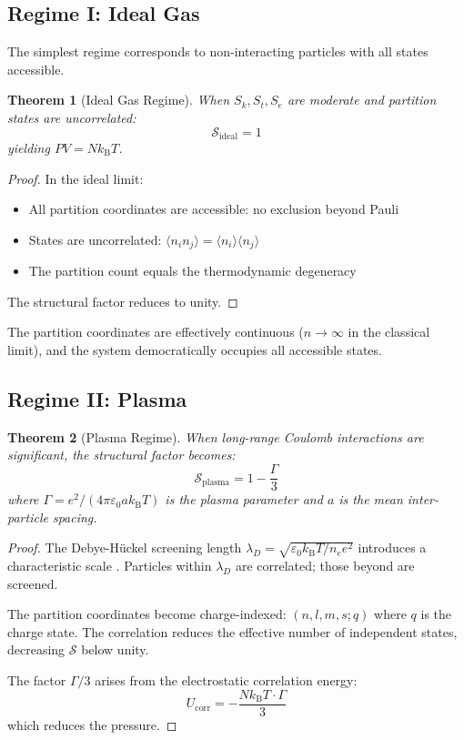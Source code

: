 \documentclass[twocolumn,10pt,a4paper]{article}
\newtheorem{theorem}{Theorem}[section]
\theoremstyle{definition}
\theoremstyle{remark}
\newcommand{\kB}{k_{\mathrm{B}}}
\newcommand{\Sk}{S_k}
\newcommand{\St}{S_t}
\newcommand{\Se}{S_e}
\begin{document}
\subsection{Regime I: Ideal Gas}

The simplest regime corresponds to non-interacting particles with all states accessible.

\begin{theorem}[Ideal Gas Regime]
When $\Sk, \St, \Se$ are moderate and partition states are uncorrelated:
\begin{equation}
    \mathcal{S}_{\text{ideal}} = 1
\end{equation}
yielding $PV = N\kB T$.
\end{theorem}

\begin{proof}
In the ideal limit:
\begin{itemize}
    \item All partition coordinates are accessible: no exclusion beyond Pauli
    \item States are uncorrelated: $\langle n_i n_j \rangle = \langle n_i \rangle \langle n_j \rangle$
    \item The partition count equals the thermodynamic degeneracy
\end{itemize}
The structural factor reduces to unity.
\end{proof}

The partition coordinates are effectively continuous ($n \to \infty$ in the classical limit), and the system democratically occupies all accessible states.

\subsection{Regime II: Plasma}

\begin{theorem}[Plasma Regime]
When long-range Coulomb interactions are significant, the structural factor becomes:
\begin{equation}
    \mathcal{S}_{\text{plasma}} = 1 - \frac{\Gamma}{3}
\end{equation}
where $\Gamma = e^2/(4\pi\varepsilon_0 a \kB T)$ is the plasma parameter and $a$ is the mean inter-particle spacing.
\end{theorem}

\begin{proof}
The Debye-H\"{u}ckel screening length $\lambda_D = \sqrt{\varepsilon_0 \kB T / n_e e^2}$ introduces a characteristic scale \cite{debye1923}. Particles within $\lambda_D$ are correlated; those beyond are screened.

The partition coordinates become charge-indexed: $(n, l, m, s; q)$ where $q$ is the charge state. The correlation reduces the effective number of independent states, decreasing $\mathcal{S}$ below unity.

The factor $\Gamma/3$ arises from the electrostatic correlation energy:
\begin{equation}
    U_{\text{corr}} = -\frac{N\kB T \cdot \Gamma}{3}
\end{equation}
which reduces the pressure.
\end{proof}
\end{document}
